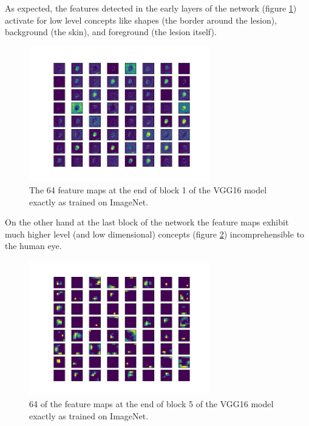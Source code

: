 As expected, the features detected in the early layers of the network (figure \ref{fig:vgg16_block1}) activate for low level concepts like shapes (the border around the lesion), background (the skin), and foreground (the lesion itself).

\begin{figure}[ht]
    \centering
    \includegraphics[width=0.7\textwidth]{figs/vgg16_block1.png}
    \caption{The 64 feature maps at the end of block 1 of the VGG16 model exactly as trained on ImageNet.}
    \label{fig:vgg16_block1}
\end{figure}

On the other hand at the last block of the network the feature maps exhibit much higher level (and low dimensional) concepts (figure \ref{fig:vgg16_block5}) incomprehensible to the human eye.

\begin{figure}[ht]
    \centering
    \includegraphics[width=0.7\textwidth]{figs/vgg16_block5.png}
    \caption{64 of the feature maps at the end of block 5 of the VGG16 model exactly as trained on ImageNet.}
    \label{fig:vgg16_block5}
\end{figure}

